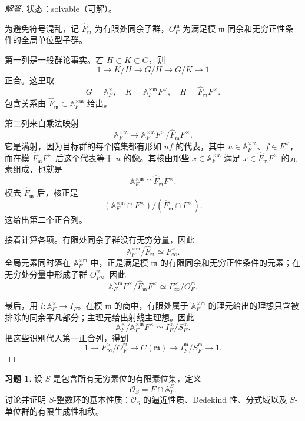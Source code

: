 \documentclass[11pt,a4paper,openany]{ctexbook}
\numberwithin{equation}{chapter}
\newcommand{\A}{\mathbb{A}}
\theoremstyle{plain}
\theoremstyle{definition}
\newtheorem{exercise}[theorem]{习题}
\theoremstyle{remark}
\begin{document}
\begin{proof}[解答]
状态：solvable（可解）。

为避免符号混乱，记 $\widehat F_{\mathfrak m}$ 为有限处同余子群，$O_F^{\mathfrak m}$ 为满足模 $\mathfrak m$ 同余和无穷正性条件的全局单位型子群。

第一列是一般群论事实。若 $H\subset K\subset G$，则
\[
 1\to K/H\to G/H\to G/K\to1
\]
正合。这里取
\[
 G=\A_F^\times,\quad
 K=\A_F^{\times\mathfrak m}F^\times,\quad
 H=\widehat F_{\mathfrak m}F^\times.
\]
包含关系由 $\widehat F_{\mathfrak m}\subset\A_F^{\times\mathfrak m}$ 给出。

第二列来自乘法映射
\[
 \A_F^{\times\mathfrak m}\to
 \A_F^{\times\mathfrak m}F^\times/\widehat F_{\mathfrak m}F^\times.
\]
它是满射，因为目标群的每个陪集都有形如 $uf$ 的代表，其中
$u\in\A_F^{\times\mathfrak m}$、$f\in F^\times$，而在模
$\widehat F_{\mathfrak m}F^\times$ 后这个代表等于 $u$ 的像。其核由那些
$x\in\A_F^{\times\mathfrak m}$ 满足 $x\in\widehat F_{\mathfrak m}F^\times$ 的元素组成，也就是
\[
 \A_F^{\times\mathfrak m}\cap \widehat F_{\mathfrak m}F^\times.
\]
模去 $\widehat F_{\mathfrak m}$ 后，核正是
\[
 (\A_F^{\times\mathfrak m}\cap F^\times)/(\widehat F_{\mathfrak m}\cap F^\times).
\]
这给出第二个正合列。

接着计算各项。有限处同余子群没有无穷分量，因此
\[
 \A_F^{\times\mathfrak m}/\widehat F_{\mathfrak m}\simeq F_\infty^\times.
\]
全局元素同时落在 $\A_F^{\times\mathfrak m}$ 中，正是满足模 $\mathfrak m$ 的有限同余和无穷正性条件的元素；在无穷处分量中形成子群 $O_F^{\mathfrak m}$。因此
\[
 \A_F^{\times\mathfrak m}F^\times/\widehat F_{\mathfrak m}F^\times
 \simeq F_\infty^\times/O_F^{\mathfrak m}.
\]

最后，用 $i:\A_F^\times\to I_F$。在模 $\mathfrak m$ 的商中，有限处属于 $\A_F^{\times\mathfrak m}$ 的理元给出的理想只含被排除的同余平凡部分；主理元给出射线主理想。因此
\[
 \A_F^\times/\A_F^{\times\mathfrak m}F^\times
 \simeq I_F^{\mathfrak m}/S_F^{\mathfrak m}.
\]
把这些识别代入第一正合列，得到
\[
1\to F_\infty^\times/O_F^{\mathfrak m}
\to C(\mathfrak m)\to I_F^{\mathfrak m}/S_F^{\mathfrak m}\to1.
\]
\end{proof}

\begin{exercise}
设 $S$ 是包含所有无穷素位的有限素位集，定义
\[
 \mathcal O_S=F\cap\A_F^S.
\]
讨论并证明 $S$-整数环的基本性质：$\mathcal O_S$ 的逼近性质、Dedekind 性、分式域以及 $S$-单位群的有限生成性和秩。
\end{exercise}
\end{document}
